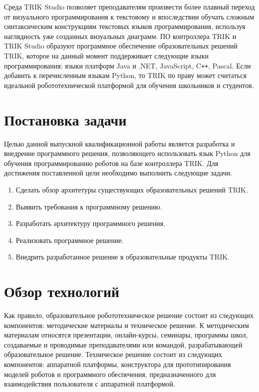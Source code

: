 \documentclass[14pt]{matmex-diploma-custom}
\begin{document}
Среда TRIK Studio позволяет преподавателям произвести более плавный переход от визуального программирования к текстовому и впоследствии обучать сложным синтаксическим конструкциям текстовых языков программирования, используя наглядность уже созданных визуальных диаграмм. ПО контроллера TRIK и TRIK Studio образуют программное обеспечение образовательных решений TRIK, которое на данный момент поддерживает следующие языки программирования: языки платформ Java и .NET, JavaScript, C\texttt{++}, Pascal. Если добавить к перечисленным языкам Python, то TRIK по праву может считаться идеальной робототехнической платформой для обучения школьников и студентов.


\section*{Постановка задачи}

Целью данной выпускной квалификационной работы является разработка и внедрение программного решения, позволяющего использовать язык Python для обучения программированию роботов на базе контроллера TRIK. Для достижения поставленной цели необходимо выполнить следующие задачи.

\begin{enumerate}
\item Сделать обзор архитетуры существующих образовательных решений TRIK.
\item Выявить требования к программному решению.
\item Разработать архитектуру программного решения.
\item Реализовать программное решение.
\item Внедрить разработанное решение в образовательные продукты TRIK.
\end{enumerate}

\section{Обзор технологий}

Как правило, образовательное робототехническое решение состоит из следующих компонентов: методические материалы и техническое решение. К методическим материалам относятся презентации, онлайн-курсы, семинары, программы школ, создаваемые и проводимые преподавателями или командой, разрабатывающей образовательное решение. Техническое решение состоит из следующих компонентов: аппаратной платформы, конструктора для прототипирования моделей роботов и программного обеспечения, предназначенного для взаимодействия пользователя с аппаратной платформой.
\end{document}
